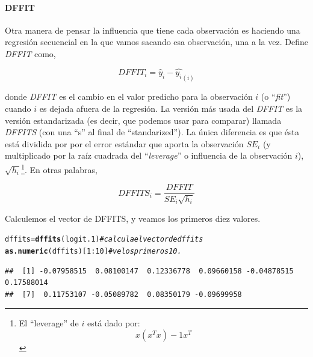 \documentclass[onesided]{article}\usepackage[]{graphicx}\usepackage[]{color}
\makeatletter
\newcommand{\hlnum}[1]{\textcolor[rgb]{0.686,0.059,0.569}{#1}}%
\newcommand{\hlcom}[1]{\textcolor[rgb]{0.678,0.584,0.686}{\textit{#1}}}%
\newcommand{\hlopt}[1]{\textcolor[rgb]{0,0,0}{#1}}%
\newcommand{\hlstd}[1]{\textcolor[rgb]{0.345,0.345,0.345}{#1}}%
\newcommand{\hlkwb}[1]{\textcolor[rgb]{0.69,0.353,0.396}{#1}}%
\newcommand{\hlkwd}[1]{\textcolor[rgb]{0.737,0.353,0.396}{\textbf{#1}}}%
\newenvironment{kframe}{%
 \def\at@end@of@kframe{}%
 \ifinner\ifhmode%
  \def\at@end@of@kframe{\end{minipage}}%
  \begin{minipage}{\columnwidth}%
 \fi\fi%
 \def\FrameCommand##1{\hskip\@totalleftmargin \hskip-\fboxsep
 \colorbox{shadecolor}{##1}\hskip-\fboxsep
     \hskip-\linewidth \hskip-\@totalleftmargin \hskip\columnwidth}%
 \MakeFramed {\advance\hsize-\width
   \@totalleftmargin\z@ \linewidth\hsize
   \@setminipage}}%
 {\par\unskip\endMakeFramed%
 \at@end@of@kframe}
\newenvironment{knitrout}{}{} %
\makeatother
\begin{document}
\paragraph{DFFIT} Otra manera de pensar la influencia que tiene cada observaci\'on es haciendo una regresi\'on secuencial en la que vamos sacando esa observaci\'on, una a la vez. Define \emph{DFFIT} como,  

\begin{equation}\label{DFFIT}
DFFIT_{i} = \hat{y}_{i} - \hat{y_{i}}_{(i)}
\end{equation}

donde \emph{DFFIT} es el cambio en el valor predicho para la observaci\'on $i$ (o ``\emph{fit}'') cuando $i$ es dejada afuera de la regresi\'on. La versi\'on m\'as usada del \emph{DFFIT} es la versi\'on estandarizada (es decir, que podemos usar para comparar) llamada \emph{DFFITS} (con una ``s'' al final de ``standarized''). La \'unica diferencia es que \'esta est\'a dividida por por el error est\'andar que aporta la observaci\'on $SE_{i}$ (y multiplicado por la ra\'iz cuadrada del ``\emph{leverage}'' o influencia de la observaci\'on $i$), $\sqrt{h_{i}}$\footnote{El ``leverage'' de $i$ est\'a dado por: \begin{equation}x(x^{T}x)-1x^{T}\end{equation}}. En otras palabras,


\begin{equation}\label{DFFIT}
DFFITS_{i} = \frac{DFFIT}{SE_{i}\sqrt{h_{i}}}
\end{equation}

Calculemos el vector de DFFITS, y veamos los primeros diez valores.

\begin{knitrout}
\color{fgcolor}\begin{kframe}
\begin{alltt}
\hlstd{dffits} \hlkwb{=} \hlkwd{dffits}\hlstd{(logit.1)} \hlcom{# calcula el vector de dffits}
\hlkwd{as.numeric}\hlstd{(dffits)[}\hlnum{1}\hlopt{:}\hlnum{10}\hlstd{]} \hlcom{# ve los primeros 10.}
\end{alltt}
\begin{verbatim}
##  [1] -0.07958515  0.08100147  0.12336778  0.09660158 -0.04878515  0.17588014
##  [7]  0.11753107 -0.05089782  0.08350179 -0.09699958
\end{verbatim}
\end{kframe}
\end{knitrout}
\end{document}
